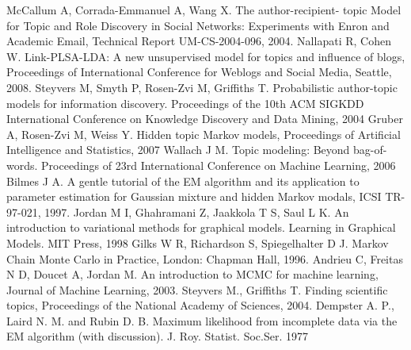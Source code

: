 \documentclass[12pt]{article}
\begin{document}
\begin{thebibliography}{@@@@}
		McCallum A, Corrada-Emmanuel A, Wang X. The author-recipient- topic Model for Topic and Role Discovery in Social Networks: Experiments with Enron and Academic Email, Technical Report UM-CS-2004-096, 2004.
		Nallapati R, Cohen W. Link-PLSA-LDA: A new unsupervised model for topics and influence of blogs, Proceedings of International Conference for Weblogs and Social Media, Seattle, 2008.
	Steyvers M, Smyth P, Rosen-Zvi M, Griffiths T. Probabilistic author-topic models for information discovery. Proceedings of the 10th ACM SIGKDD International Conference on Knowledge Discovery and Data Mining, 2004
		Gruber A, Rosen-Zvi M, Weiss Y. Hidden topic Markov models, Proceedings of Artificial Intelligence and Statistics, 2007
		 Wallach J M. Topic modeling: Beyond bag-of-words. Proceedings of 23rd International Conference on Machine Learning, 2006
		Bilmes J A. A gentle tutorial of the EM algorithm and its application to parameter estimation for Gaussian mixture and hidden Markov modals, ICSI TR-97-021, 1997.
		Jordan M I, Ghahramani Z, Jaakkola T S, Saul L K. An introduction to variational methods for graphical models. Learning in Graphical Models. MIT Press, 1998
		Gilks W R, Richardson S, Spiegelhalter D J. Markov Chain Monte Carlo in Practice, London: Chapman  Hall, 1996.
		Andrieu C, Freitas N D, Doucet A, Jordan M. An introduction to MCMC for machine learning, Journal of Machine Learning, 2003.
		Steyvers M., Griffiths T. Finding scientific topics, Proceedings of the National Academy of Sciences,  2004.
		Dempster A. P., Laird N. M. and Rubin D. B. Maximum likelihood from incomplete data via the EM algorithm (with discussion). J. Roy. Statist. Soc.Ser. 1977
	\end{thebibliography}
\end{document}
